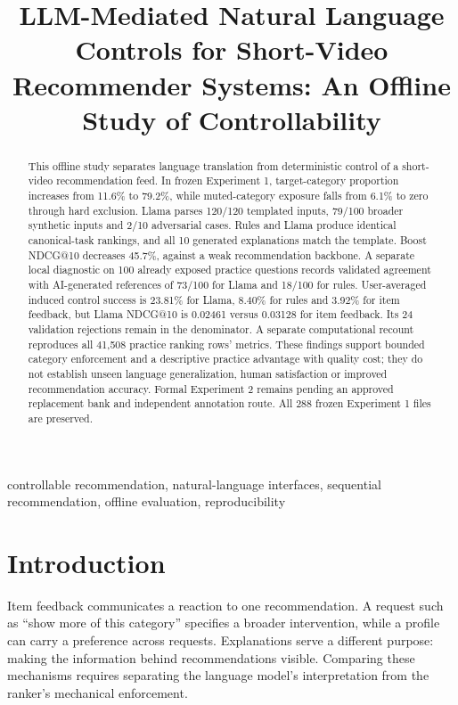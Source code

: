 \documentclass[conference]{IEEEtran}
\title{LLM-Mediated Natural Language Controls for Short-Video Recommender Systems: An Offline Study of Controllability}
\author{\IEEEauthorblockN{Vibhor Malik}\IEEEauthorblockA{M.Sc. in Applied Computing\\British Columbia Institute of Technology\\Supervisor: Borna Noureddin\\COMP 9500 research project\\Review draft: 14 October 2026, Vancouver time}}
\begin{document}
\maketitle
\thispagestyle{plain}\pagestyle{plain}
\begin{abstract}
This offline study separates language translation from deterministic control of a short-video recommendation feed. In frozen Experiment 1, target-category proportion increases from 11.6\% to 79.2\%, while muted-category exposure falls from 6.1\% to zero through hard exclusion. Llama parses 120/120 templated inputs, 79/100 broader synthetic inputs and 2/10 adversarial cases. Rules and Llama produce identical canonical-task rankings, and all 10 generated explanations match the template. Boost NDCG@10 decreases 45.7\%, against a weak recommendation backbone. A separate local diagnostic on 100 already exposed practice questions records validated agreement with AI-generated references of 73/100 for Llama and 18/100 for rules. User-averaged induced control success is 23.81\% for Llama, 8.40\% for rules and 3.92\% for item feedback, but Llama NDCG@10 is 0.02461 versus 0.03128 for item feedback. Its 24 validation rejections remain in the denominator. A separate computational recount reproduces all 41,508 practice ranking rows' metrics. These findings support bounded category enforcement and a descriptive practice advantage with quality cost; they do not establish unseen language generalization, human satisfaction or improved recommendation accuracy. Formal Experiment 2 remains pending an approved replacement bank and independent annotation route. All 288 frozen Experiment 1 files are preserved.
\end{abstract}
\begin{IEEEkeywords}
controllable recommendation, natural-language interfaces, sequential recommendation, offline evaluation, reproducibility
\end{IEEEkeywords}

\section{Introduction}
Item feedback communicates a reaction to one recommendation. A request such as ``show more of this category'' specifies a broader intervention, while a profile can carry a preference across requests. Explanations serve a different purpose: making the information behind recommendations visible. Comparing these mechanisms requires separating the language model's interpretation from the ranker's mechanical enforcement.
\end{document}
